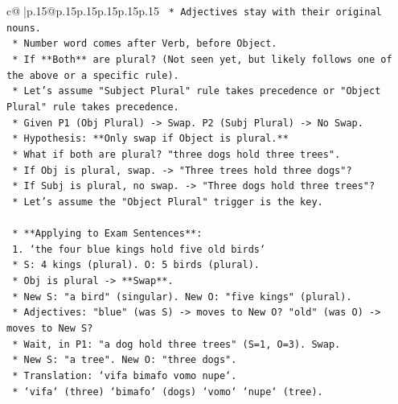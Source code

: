 \documentclass{article}
\begin{document}
{\begin{supertabular}{c@{$\;$}|p{.15\linewidth}@{}p{.15\linewidth}p{.15\linewidth}p{.15\linewidth}p{.15\linewidth}p{.15\linewidth}}
{{{\texttt{                        *   Adjectives stay with their original nouns.} \\
\texttt{                        *   Number word comes after Verb, before Object.} \\
\texttt{                    *   If **Both** are plural? (Not seen yet, but likely follows one of the above or a specific rule).} \\
\texttt{                        *   Let's assume "Subject Plural" rule takes precedence or "Object Plural" rule takes precedence.} \\
\texttt{                        *   Given P1 (Obj Plural) {-}> Swap. P2 (Subj Plural) {-}> No Swap.} \\
\texttt{                        *   Hypothesis: **Only swap if Object is plural.**} \\
\texttt{                        *   What if both are plural? "three dogs hold three trees".} \\
\texttt{                        *   If Obj is plural, swap. {-}> "Three trees hold three dogs"?} \\
\texttt{                        *   If Subj is plural, no swap. {-}> "Three dogs hold three trees"?} \\
\texttt{                        *   Let's assume the "Object Plural" trigger is the key.} \\
\\ 
\texttt{            *   **Applying to Exam Sentences**:} \\
\texttt{                1.  `the four blue kings hold five old birds`} \\
\texttt{                    *   S: 4 kings (plural). O: 5 birds (plural).} \\
\texttt{                    *   Obj is plural {-}> **Swap**.} \\
\texttt{                    *   New S: "a bird" (singular). New O: "five kings" (plural).} \\
\texttt{                    *   Adjectives: "blue" (was S) {-}> moves to New O? "old" (was O) {-}> moves to New S?} \\
\texttt{                    *   Wait, in P1: "a dog hold three trees" (S=1, O=3). Swap.} \\
\texttt{                        *   New S: "a tree". New O: "three dogs".} \\
\texttt{                        *   Translation: `vifa bimafo vomo nupe`.} \\
\texttt{                        *   `vifa` (three) `bimafo` (dogs) `vomo` `nupe` (tree).} \\
}}}
\end{supertabular}}
\end{document}
